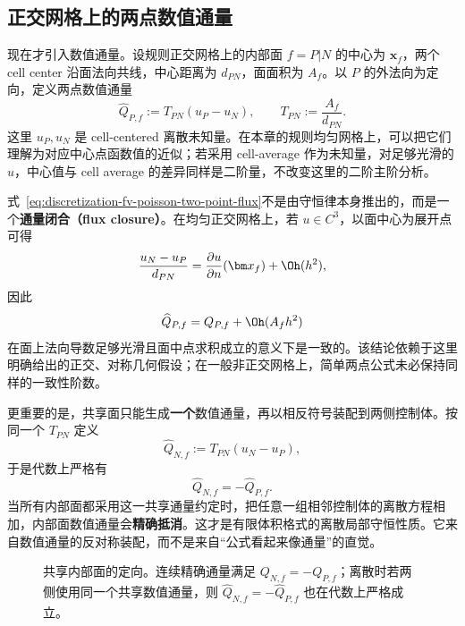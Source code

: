 \subsection{正交网格上的两点数值通量}

现在才引入数值通量。设规则正交网格上的内部面 $f=P|N$ 的中心为 $\bm x_f$，两个 cell center 沿面法向共线，中心距离为 $d_{PN}$，面面积为 $A_f$。以 $P$ 的外法向为定向，定义两点数值通量
\begin{equation}
\boxed{
\widehat Q_{P,f}
:=T_{PN}(u_P-u_N),
\qquad
T_{PN}:=\frac{A_f}{d_{PN}}.
}
\label{eq:discretization-fv-poisson-two-point-flux}
\end{equation}
这里 $u_P,u_N$ 是 cell-centered 离散未知量。在本章的规则均匀网格上，可以把它们理解为对应中心点函数值的近似；若采用 cell-average 作为未知量，对足够光滑的 $u$，中心值与 cell average 的差异同样是二阶量，不改变这里的二阶主阶分析。

式~\eqref{eq:discretization-fv-poisson-two-point-flux}不是由守恒律本身推出的，而是一个\textbf{通量闭合（flux closure）}。在均匀正交网格上，若 $u\in C^3$，以面中心为展开点可得
\begin{equation}
\frac{u_N-u_P}{d_{PN}}
=
\frac{\partial u}{\partial n}(\bm x_f)+\Oh(h^2),
\end{equation}
因此
\begin{equation}
\widehat Q_{P,f}
=Q_{P,f}+\Oh(A_fh^2)
\end{equation}
在面上法向导数足够光滑且面中点求积成立的意义下是一致的。该结论依赖于这里明确给出的正交、对称几何假设；在一般非正交网格上，简单两点公式未必保持同样的一致性阶数。

更重要的是，共享面只能生成\textbf{一个}数值通量，再以相反符号装配到两侧控制体。按同一个 $T_{PN}$ 定义
\begin{equation}
\widehat Q_{N,f}:=T_{PN}(u_N-u_P),
\end{equation}
于是代数上严格有
\begin{equation}
\boxed{
\widehat Q_{N,f}=-\widehat Q_{P,f}.
}
\label{eq:discretization-numerical-flux-antisymmetry}
\end{equation}
当所有内部面都采用这一共享通量约定时，把任意一组相邻控制体的离散方程相加，内部面数值通量会\textbf{精确抵消}。这才是有限体积格式的离散局部守恒性质。它来自数值通量的反对称装配，而不是来自“公式看起来像通量”的直觉。

\begin{figure}[htbp]
\centering
{}
\caption{共享内部面的定向。连续精确通量满足 $Q_{N,f}=-Q_{P,f}$；离散时若两侧使用同一个共享数值通量，则 $\widehat Q_{N,f}=-\widehat Q_{P,f}$ 也在代数上严格成立。}
\label{fig:discretization-fv-cell-face}
\end{figure}

